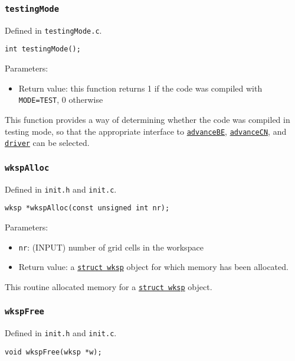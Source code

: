 \documentclass[12pt]{article}
\begin{document}
\subsubsection{\texttt{testingMode}}
\label{sssec:testingMode}

Defined in \verb=testingMode.c=.

\begin{verbatim}
int testingMode();
\end{verbatim}

Parameters:
\begin{itemize}
\item Return value: this function returns 1 if the code was compiled with \verb!MODE=TEST!, 0 otherwise
\end{itemize}

This function provides a way of determining whether the code was compiled in testing mode, so that the appropriate interface to \hyperref[sssec:advanceBE]{\texttt{advanceBE}}, \hyperref[sssec:advanceCN]{\texttt{advanceCN}}, and \hyperref[sssec:driver]{\texttt{driver}} can be selected.

\subsubsection{\texttt{wkspAlloc}}
\label{sssec:wkspAlloc}

Defined in \verb=init.h= and \verb=init.c=.

\begin{verbatim}
wksp *wkspAlloc(const unsigned int nr);
\end{verbatim}

Parameters:
\begin{itemize}
\item \texttt{nr}: (INPUT) number of grid cells in the workspace
\item Return value: a \hyperref[sssec:datastructures]{\texttt{struct wksp}} object for which memory has been allocated.
\end{itemize}

This routine allocated memory for a \hyperref[sssec:datastructures]{\texttt{struct wksp}} object.

\subsubsection{\texttt{wkspFree}}
\label{sssec:wkspFree}

Defined in \verb=init.h= and \verb=init.c=.

\begin{verbatim}
void wkspFree(wksp *w);
\end{verbatim}
\end{document}
